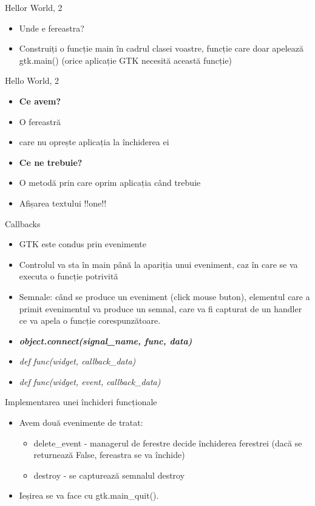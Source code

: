 \documentclass{beamer}
\begin{document}
\begin{frame}{Hellor World, 2}
\begin{itemize}
	\item Unde e fereastra?
	\item \pause Construiți o funcție main în cadrul clasei voastre, funcție care doar apelează gtk.main() (orice aplicație GTK necesită această funcție)
\end{itemize}
\end{frame}

\begin{frame}{Hello World, 2}
\begin{itemize}
	\item \textbf{Ce avem?}
	\item \pause O fereastră
	\item \pause care nu oprește aplicația la închiderea ei
	\item \pause \textbf{Ce ne trebuie?}
	\item \pause O metodă prin care oprim aplicația când trebuie
	\item \pause Afișarea textului !!one!!
\end{itemize}
\end{frame}

\begin{frame}{Callbacks}
\begin{itemize}
	\item GTK este condus prin evenimente
	\item \pause Controlul va sta în main până la apariția unui eveniment, caz în care se va executa o funcție potrivită
	\item \pause Semnale: când se produce un eveniment (click mouse buton), elementul care a primit evenimentul va produce un semnal, care va fi capturat de un handler ce va apela o funcție corespunzătoare.
	\item \pause \textbf{\textit{object.connect(signal\_name, func, data)}}
	\item \pause \textit{def func(widget, callback\_data)}
	\item \pause \textit{def func(widget, event, callback\_data)}
\end{itemize}
\end{frame}

\begin{frame}{Implementarea unei închideri funcționale}
\begin{itemize}
	\item Avem două evenimente de tratat:
		\begin{itemize}
			\item delete\_event - managerul de ferestre decide închiderea ferestrei (dacă se returnează False, fereastra se va închide)
			\item destroy - se capturează semnalul destroy
		\end{itemize}
	\item \pause Ieșirea se va face cu gtk.main\_quit().
\end{itemize}
\end{frame}
\end{document}
